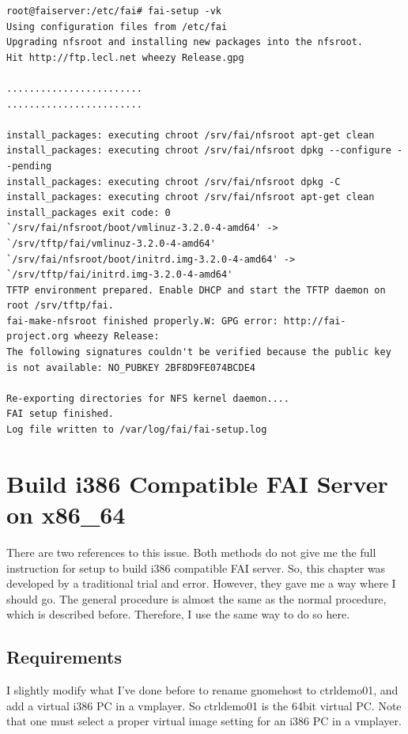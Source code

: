 \documentclass[11pt
  , a4paper
  , article
  , oneside
]{memoir}
\begin{document}
\begin{lstlisting}
root@faiserver:/etc/fai# fai-setup -vk
Using configuration files from /etc/fai
Upgrading nfsroot and installing new packages into the nfsroot.
Hit http://ftp.lecl.net wheezy Release.gpg

........................
........................

install_packages: executing chroot /srv/fai/nfsroot apt-get clean
install_packages: executing chroot /srv/fai/nfsroot dpkg --configure --pending
install_packages: executing chroot /srv/fai/nfsroot dpkg -C
install_packages: executing chroot /srv/fai/nfsroot apt-get clean
install_packages exit code: 0
`/srv/fai/nfsroot/boot/vmlinuz-3.2.0-4-amd64' -> `/srv/tftp/fai/vmlinuz-3.2.0-4-amd64'
`/srv/fai/nfsroot/boot/initrd.img-3.2.0-4-amd64' -> `/srv/tftp/fai/initrd.img-3.2.0-4-amd64'
TFTP environment prepared. Enable DHCP and start the TFTP daemon on root /srv/tftp/fai.
fai-make-nfsroot finished properly.W: GPG error: http://fai-project.org wheezy Release: 
The following signatures couldn't be verified because the public key is not available: NO_PUBKEY 2BF8D9FE074BCDE4

Re-exporting directories for NFS kernel daemon....
FAI setup finished.
Log file written to /var/log/fai/fai-setup.log

\end{lstlisting}

\chapter{Build i386 Compatible FAI Server on x86\_{64}}
There are two references \citep{faii386,faiguide} to this issue. Both methods do not give me the full instruction for setup to build i386 compatible FAI server. So, this chapter was developed by a traditional trial and error. However, they \citep{faii386,faiguide} gave me a way where I should go. The general procedure is almost the same as the normal procedure, which is described before. Therefore, I use the same way to do so here. 

\section{Requirements}
I slightly modify what I've done before to rename gnomehost to ctrldemo01, and add a virtual i386 PC in a vmplayer. So ctrldemo01 is the 64bit virtual PC. Note that one must select a proper virtual image setting for an i386 PC in a vmplayer.
\end{document}
